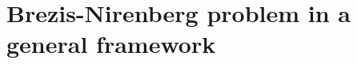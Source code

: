 \documentclass[11pt]{article}
\newtheorem{proposition}{Proposition}[section]
\newcommand{\spacegr}{H^{1}_{0,\gamma}(\Omega)}
\begin{document}

 





\section{Brezis-Nirenberg problem in a general framework} \label{sec:brezis_nirenberg_general}
\end{document}
